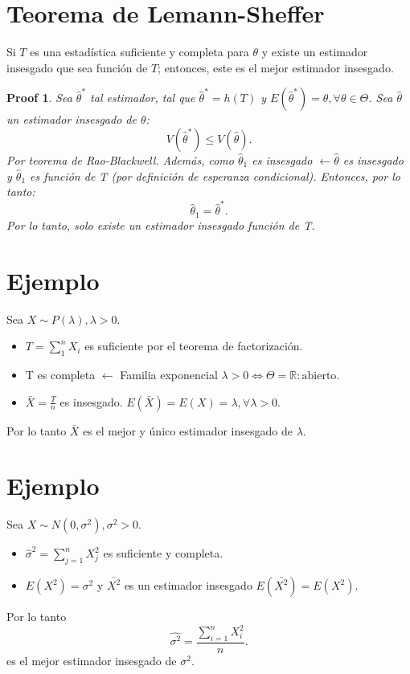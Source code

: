 \documentclass{article}
\newtheorem{myprf}{Proof}
\begin{document}
\section{Teorema de Lemann-Sheffer}
Si $T$ es una estadística suficiente y completa para $\theta$ y existe un estimador insesgado que sea función de $T$; entonces, este es el mejor estimador insesgado.

\begin{myprf}
	Sea $\hat{\theta}^{*}$ tal estimador, tal que $\hat{\theta}^{*}=h{(T)}$ y $E{(\hat{\theta}^{*})}=\theta,\forall \theta \in \Theta$. Sea $\hat{\theta}$ un estimador insesgado de $\theta$:
	\[ V{(\hat{\theta}^{*})}\leq V{(\hat{\theta})}.\]
	Por teorema de Rao-Blackwell. Además, como $\hat{\theta}_{1}$ es insesgado $\leftarrow \hat{\theta}$ es insesgado y $\hat{\theta}_{1}$ es función de T (por definición de esperanza condicional). Entonces, por lo tanto:
	\[ \hat{\theta}_{1}=\hat{\theta}^{*}.\]
Por lo tanto, solo existe un estimador insesgado función de T.
\end{myprf}

\section{Ejemplo}
Sea $X \sim  P{(\lambda)}, \lambda > 0$.
\begin{itemize}
	\item $T=\sum_{1}^{n}X_{i}$ es suficiente por el teorema de factorización.
	\item T es completa $\leftarrow$ Familia exponencial $\lambda > 0 \iff \Theta = \mathbb{R}: \text{abierto}$.
	\item $\bar{X}=\frac{T}{n}$ es insesgado. $E{(\bar{X})}=E{(X)}=\lambda, \forall \lambda > 0$.
\end{itemize}

Por lo tanto $\bar{X}$ es el mejor y único estimador insesgado de $\lambda$.

\section{Ejemplo}
Sea $X\sim N(0,\sigma^{2}),\sigma^{2}>0$.
\begin{itemize}
	\item $\hat{\sigma}^{2}=\sum_{j=1}^{n}X_{j}^{2}$ es suficiente y completa.
	\item $E{(X^{2})}=\sigma^{2}$ y $\bar{X^{2}}$ es un estimador insesgado $E{(\bar{X^{2}})}=E{(X^{2})}$.
\end{itemize}
Por lo tanto
\[ \hat{\sigma^{2}}=\frac{\sum_{i=1}^{n}X_{i}^{2}}{n}.\]
es el mejor estimador insesgado de $\sigma^{2}$.
\end{document}
